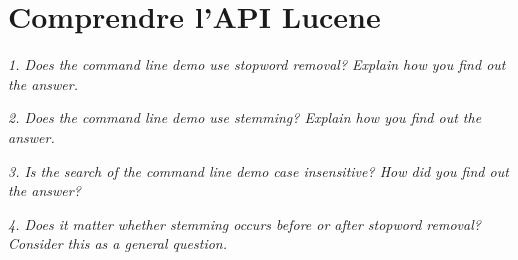 \chapter{Comprendre l'API Lucene}

\textit{1. Does the command line demo use stopword removal? Explain how you find out the answer.}


\textit{2. Does the command line demo use stemming? Explain how you find out the answer.}


\textit{3. Is the search of the command line demo case insensitive? How did you find out the answer?}

   
\textit{4. Does it matter whether stemming occurs before or after stopword removal? Consider this as a general question.}

